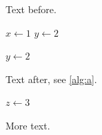 \documentclass{article}
\begin{document}
Text before.
\begin{algorithm}
\caption{Insertion sort with a caption long enough that it does not fit on one line any longer here}
\label{alg:a}
\begin{algorithmic}[1]
\State $x \gets 1$
\State $y \gets 2$
\end{algorithmic}
\end{algorithm}
\begin{algorithm}[H]
\caption{Short}
\begin{algorithmic}
\State $y \gets 2$
\end{algorithmic}
\end{algorithm}
Text after, see \cref{alg:a}.
\begin{algorithm}[t]
\begin{algorithmic}
\State $z \gets 3$
\end{algorithmic}
\caption{Below the lines}
\end{algorithm}
More text.
\end{document}
